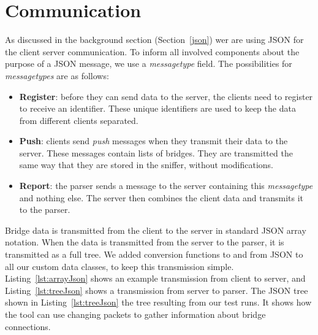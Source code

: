 \section{Communication}
\label{communication}
As discussed in the background section (Section~\ref{json}) wer are using JSON for the client server communication.
To inform all involved components about the purpose of a JSON message, we use a \textit{messagetype} field.
The possibilities for \textit{messagetypes} are as follows:
\begin{itemize}
    \item \textbf{Register}: before they can send data to the server, the clients need to register to receive an identifier.
        These unique identifiers are used to keep the data from different clients separated.
    \item \textbf{Push}: clients send \textit{push} messages when they transmit their data to the server.
        These messages contain lists of bridges.
        They are transmitted the same way that they are stored in the sniffer, without modifications.
    \item \textbf{Report}: the parser sends a message to the server containing this \textit{messagetype} and nothing else.
        The server then combines the client data and transmits it to the parser.
\end{itemize}
Bridge data is transmitted from the client to the server in standard JSON array notation.
When the data is transmitted from the server to the parser, it is transmitted as a full tree.
We added conversion functions to and from JSON to all our custom data classes, to keep this transmission simple.
Listing~\ref{lst:arrayJson} shows an example transmission from client to server, and Listing~\ref{lst:treeJson} shows a transmission from server to parser.
The JSON tree shown in Listing~\ref{lst:treeJson} the tree resulting from our test runs.
It shows how the tool can use changing packets to gather information about bridge connections.




